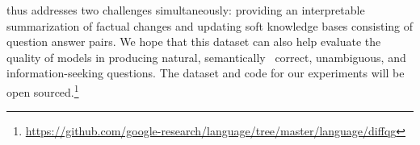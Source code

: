 \dataset{} thus 
addresses two challenges simultaneously: providing an interpretable summarization of factual changes and updating soft knowledge bases consisting of question answer pairs. %
We hope that this dataset can also help evaluate the quality of \qg{} models in producing natural, semantically \ correct, unambiguous, and information-seeking questions.
The dataset and code for our experiments will be open sourced.\footnote{\url{https://github.com/google-research/language/tree/master/language/diffqg}}



